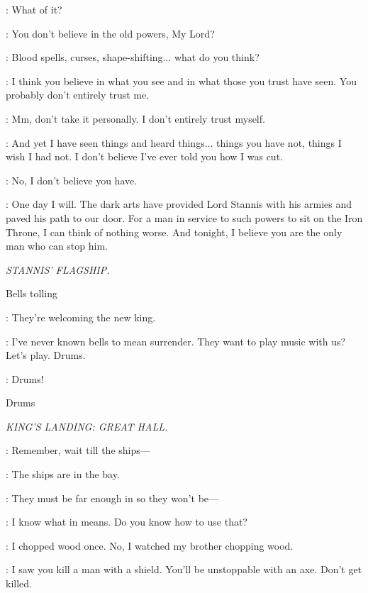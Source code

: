\TYRION: What of it? 

\VARYS: You don't believe in the old powers, My Lord? 

\TYRION: Blood spells, curses, shape-shifting$\ldots$ what do you think? 

\VARYS: I think you believe in what you see and in what those you trust have seen. You probably don't entirely trust me. 

\TYRION: Mm, don't take it personally. I don't entirely trust myself. 

\VARYS: And yet I have seen things and heard things$\ldots$  things you have not, things I wish I had not. I don't believe I've ever told you how I was cut. 

\TYRION: No, I don't believe you have. 

\VARYS: One day I will. The dark arts have provided Lord Stannis with his armies and paved his path to our door. For a man in service to such powers to sit on the Iron Throne, I can think of nothing worse. And tonight, I believe you are the only man who can stop him. 



\scene

\textit{STANNIS' FLAGSHIP.}


\sfx Bells tolling

\MATTHOS: They're welcoming the new king. 

\DAVOS: I've never known bells to mean surrender. They want to play music with us? Let's play. Drums. 

\MATTHOS:  Drums! 

\sfx Drums


\scene

\textit{KING'S LANDING: GREAT HALL.}


\TYRION: Remember, wait till the ships---  

\BRONN: The ships are in the bay. 

\TYRION: They must be far enough in so they won't be---

\BRONN: I know what in means. Do you know how to use that? 

\TYRION: I chopped wood once. No, I watched my brother chopping wood. 

\BRONN: I saw you kill a man with a shield. You'll be unstoppable with an axe. Don't get killed. 

